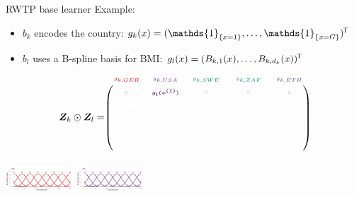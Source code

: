 \documentclass[t,10pt]{beamer}
\begin{document}
\begin{frame}{RWTP base learner}
  Example:
  \begin{itemize}
    \item $b_k$ encodes the country: $g_k(x) = (\mathds{1}_{\{x = 1\}}, \dots, \mathds{1}_{\{x = G\}})^\tran$
    \item $b_l$ uses a B-spline basis for BMI: $g_l(x) = (B_{k,1}(x), \dots, B_{k,d_k}(x))^{\mkern-1.5mu\mathsf{T}}$
  \end{itemize}
  $$
    \design_k \odot \design_l = \tiny\begin{blockarray}{ccccc}
      \color[HTML]{EE0000}g_{k,GER} & \color[HTML]{631879}g_{k,USA} & \color[HTML]{008B45}g_{k,SWE} & \color[HTML]{008280}g_{k,ZAF} & \color[HTML]{3B4992}g_{k,ETH}\\
    \begin{block}{(ccccc)}
      \phantom{x}\\
      \color{lightgray}0 & \color[HTML]{631879}\bm{g_l(x^{(1)})} & \color{lightgray}0 & \color{lightgray}0 & \color{lightgray}0 \\
      \color{white}0 & \color{white}0 & \color{white}0 & \color{white}0 & \color{white}\bm{g_l(x^{(2)})} \\
      \color{white}\bm{g_l(x^{(3)})} & \color{white}0 & \color{white}0 & \color{white}0 & \color{white}0 \\
      \color{white}\vdots & \color{white}\vdots & \color{white}\vdots & \color{white}\vdots & \color{white}\vdots \\
      \color{white}0 & \color{white}0 & \color{white}\bm{g_l(x^{(73)})} & \color{white}0 & \color{white}0 \\
      \color{white}0 & \color{white}0 & \color{white}0 & \color{white}\bm{g_l(x^{(74)})} & \color{white}0 \\
      \color{white}0 & \color{white}0 & \color{white}\bm{g_l(x^{(75)})} & \color{white}0 & \color{white}0 \\
      \phantom{x}\\
    \end{block}
  \end{blockarray}
  $$
  \normalsize
  {\includegraphics[width=0.19\textwidth]{figures/fig-bs0-GER.png}}
  {\includegraphics[width=0.19\textwidth]{figures/fig-bs0-USA.png}}

\end{frame}
\end{document}
